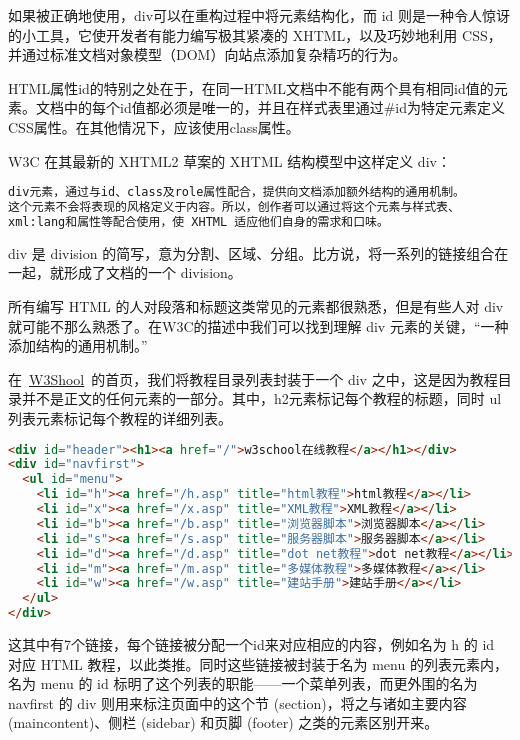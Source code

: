 如果被正确地使用，div可以在重构过程中将元素结构化，而 id 则是一种令人惊讶的小工具，它使开发者有能力编写极其紧凑的 XHTML，以及巧妙地利用 CSS，并通过标准文档对象模型（DOM）向站点添加复杂精巧的行为。

HTML属性id的特别之处在于，在同一HTML文档中不能有两个具有相同id值的元素。文档中的每个id值都必须是唯一的，并且在样式表里通过\#id为特定元素定义CSS属性。在其他情况下，应该使用class属性。


W3C 在其最新的 XHTML2 草案的 XHTML 结构模型中这样定义 div：

\begin{lstlisting}[language=HTML]
div元素，通过与id、class及role属性配合，提供向文档添加额外结构的通用机制。
这个元素不会将表现的风格定义于内容。所以，创作者可以通过将这个元素与样式表、
xml:lang和属性等配合使用，使 XHTML 适应他们自身的需求和口味。
\end{lstlisting}

div 是 division 的简写，意为分割、区域、分组。比方说，将一系列的链接组合在一起，就形成了文档的一个 division。

所有编写 HTML 的人对段落和标题这类常见的元素都很熟悉，但是有些人对 div 就可能不那么熟悉了。在W3C的描述中我们可以找到理解 div 元素的关键，``一种添加结构的通用机制。”

在~\href{http://www.w3school.com.cn/}{W3Shool}~的首页，我们将教程目录列表封装于一个 div 之中，这是因为教程目录并不是正文的任何元素的一部分。其中，h2元素标记每个教程的标题，同时 ul 列表元素标记每个教程的详细列表。

\begin{lstlisting}[language=HTML]
<div id="header"><h1><a href="/">w3school在线教程</a></h1></div>
<div id="navfirst">
  <ul id="menu">
    <li id="h"><a href="/h.asp" title="html教程">html教程</a></li>
    <li id="x"><a href="/x.asp" title="XML教程">XML教程</a></li>
    <li id="b"><a href="/b.asp" title="浏览器脚本">浏览器脚本</a></li>
    <li id="s"><a href="/s.asp" title="服务器脚本">服务器脚本</a></li>
    <li id="d"><a href="/d.asp" title="dot net教程">dot net教程</a></li>
    <li id="m"><a href="/m.asp" title="多媒体教程">多媒体教程</a></li>
    <li id="w"><a href="/w.asp" title="建站手册">建站手册</a></li>
  </ul>
</div>
\end{lstlisting}

这其中有7个链接，每个链接被分配一个id来对应相应的内容，例如名为 h 的 id 对应 HTML 教程，以此类推。同时这些链接被封装于名为 menu 的列表元素内，名为 menu 的 id 标明了这个列表的职能——一个菜单列表，而更外围的名为 navfirst 的 div 则用来标注页面中的这个节 (section)，将之与诸如主要内容 (maincontent)、侧栏 (sidebar) 和页脚 (footer) 之类的元素区别开来。

